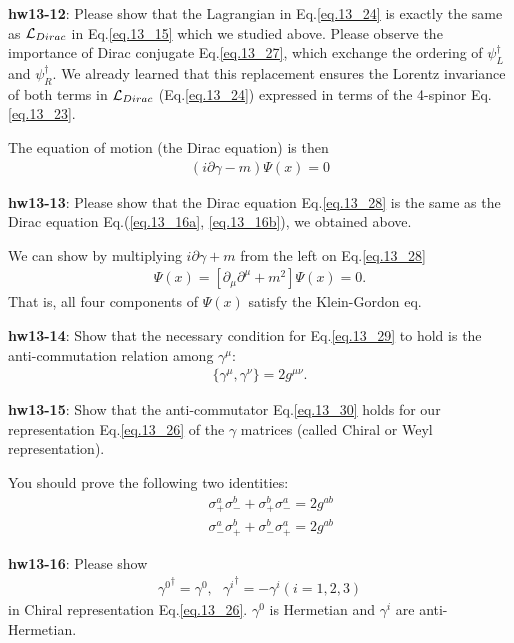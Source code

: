 \documentclass[12pt]{article}
\def\del{{\partial}}
\begin{document}
{\bf hw13-12}: Please show that the Lagrangian in Eq.\ref{eq.13_24} is exactly the same as ${\cal L}_{Dirac}$ in Eq.\ref{eq.13_15} which we studied above.  Please observe the importance of Dirac conjugate Eq.\ref{eq.13_27}, which exchange the ordering of $\psi_L^\dagger$ and $\psi_R^\dagger$. We already learned that this replacement ensures the Lorentz invariance of both terms in
  ${\cal L}_{Dirac}$ (Eq.\ref{eq.13_24}) expressed in terms of the 4-spinor Eq.\ref{eq.13_23}.

  The equation of motion (the Dirac equation) is then
\begin{eqnarray}
  ( i\del \gamma - m ) \Psi(x) = 0 \label{eq.13_28}
\end{eqnarray}

{\bf hw13-13}: Please show that the Dirac equation Eq.\ref{eq.13_28} is the same as the Dirac equation Eq.(\ref{eq.13_16a}, \ref{eq.13_16b}), we obtained above.

  We can show by multiplying $i\del \gamma + m $ from the left on Eq.\ref{eq.13_28}
\begin{eqnarray}
  [ i\del \gamma + m ] [ i\del \gamma - m ] \Psi(x)
  = [ \del_\mu \del^\mu + m^2 ] \Psi(x) = 0. \label{eq.13_29}
\end{eqnarray}
  That is, all four components of $\Psi(x)$ satisfy the Klein-Gordon eq.

{\bf hw13-14}: Show that the necessary condition for Eq.\ref{eq.13_29} to hold is the
  anti-commutation relation among $\gamma^\mu$:
\begin{eqnarray}
  \{ \gamma^\mu, \gamma^\nu \} = 2 g^{\mu\nu}. \label{eq.13_30}
\end{eqnarray}

{\bf hw13-15}: Show that the anti-commutator Eq.\ref{eq.13_30} holds for our representation
  Eq.\ref{eq.13_26} of the $\gamma$ matrices (called Chiral or Weyl representation).

  You should prove the following two identities:
\begin{eqnarray}
  && \sigma_+^a \sigma_-^b + \sigma_+^b \sigma_-^a = 2 g^{ab} \label{eq.13_31a}\\
  && \sigma_-^a \sigma_+^b + \sigma_-^b \sigma_+^a = 2 g^{ab} \label{eq.13_31b}
\end{eqnarray}
 
{\bf hw13-16}: Please show
\begin{eqnarray}
  {\gamma^0}^\dagger =  \gamma^0 , ~~~
      {\gamma^i}^\dagger = -\gamma^i (i=1,2,3) \label{eq.13_32}
\end{eqnarray}
  in Chiral representation Eq.\ref{eq.13_26}.  $\gamma^0$ is Hermetian and $\gamma^i$ are
  anti-Hermetian.
\end{document}
